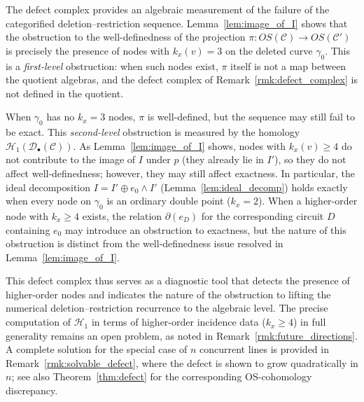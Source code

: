\documentclass[article,11pt]{amsart} \numberwithin{equation}{section}
\numberwithin{equation}{section}
\begin{document}
{\begin{rk}
	\label{rmk:defect_diagnostic}
	The defect complex provides an algebraic measurement of the 
	failure of the categorified deletion–restriction sequence. 
	Lemma~\ref{lem:image_of_I} shows that the obstruction to the 
	well-definedness of the projection $\pi:OS(\mathcal C) \longrightarrow OS(\mathcal C')$
	is precisely the presence of nodes with $k_x(v)=3$ on the deleted 
	curve $\gamma_0$. This is a \emph{first-level} obstruction: when such 
	nodes exist, $\pi$ itself is not a map between the quotient algebras, 
	and the defect complex of Remark~\ref{rmk:defect_complex} is not 
	defined in the quotient.
	
	When $\gamma_0$ has no $k_x=3$ nodes, $\pi$ is well-defined, but 
	the sequence may still fail to be exact. This \emph{second-level} 
	obstruction is measured by the homology $\mathcal H_1(\mathcal D_\bullet(\mathcal C))$. 
	As Lemma~\ref{lem:image_of_I} shows, nodes with $k_x(v)\ge 4$ do not 
	contribute to the image of $I$ under $p$ (they already lie in $I'$), 
	so they do not affect well-definedness; however, they may still 
	affect exactness. In particular, the ideal decomposition 
	$I=I'\oplus e_0\wedge I'$ (Lemma~\ref{lem:ideal_decomp}) holds 
	exactly when every node on $\gamma_0$ is an ordinary double point 
	($k_x=2$). When a higher-order node with $k_x\ge 4$ exists, the 
	relation $\partial(e_D)$ for the corresponding circuit $D$ containing 
	$e_0$ may introduce an obstruction to exactness, but the nature of 
	this obstruction is distinct from the well-definedness issue resolved 
	in Lemma~\ref{lem:image_of_I}.
	
	This defect complex thus serves as a diagnostic tool that detects 
	the presence of higher-order nodes and indicates the nature of the 
	obstruction to lifting the numerical deletion--restriction recurrence 
	to the algebraic level. The precise computation of $\mathcal H_1$ 
	in terms of higher-order incidence data ($k_x\ge 4$) in full generality 
	remains an open problem, as noted in Remark~\ref{rmk:future_directions}. 
	A complete solution for the special case of $n$ concurrent lines is 
	provided in Remark~\ref{rmk:solvable_defect}, where the defect is shown 
	to grow quadratically in $n$; see also Theorem~\ref{thm:defect} for the 
	corresponding OS-cohomology discrepancy.
\end{rk}

}
\end{document}
